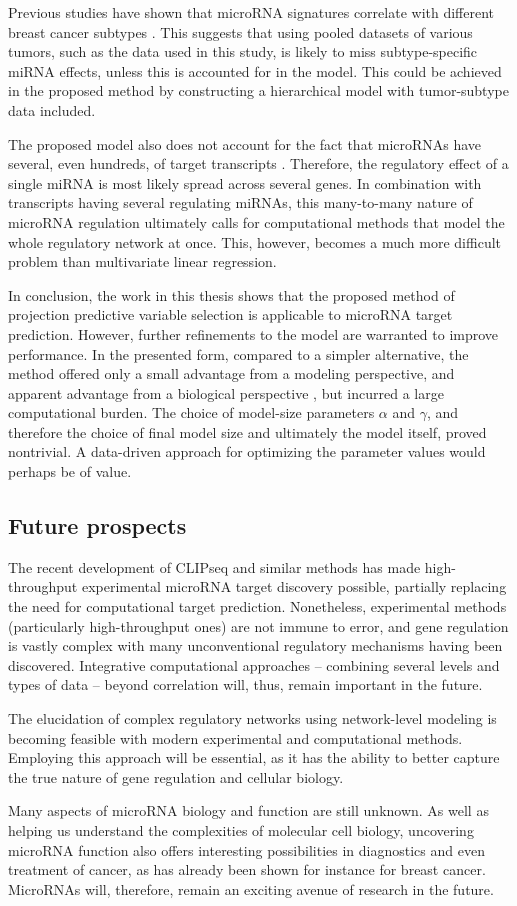 Previous studies have shown that microRNA signatures correlate
with different breast cancer subtypes \citep{Blenkiron2007}. This suggests that
using pooled datasets of various tumors, such as the data used in this
study, is likely to miss subtype-specific miRNA effects, unless this is accounted
for in the model. This could be achieved in the proposed method by
constructing a hierarchical model with tumor-subtype data included.

The proposed model also does not account for the fact that microRNAs have
several, even hundreds, of target transcripts \citep{}. Therefore, the regulatory
effect of a single miRNA is most likely spread across several genes. In
combination with transcripts having several regulating miRNAs, this many-to-many
nature of microRNA regulation ultimately calls for computational methods
that model the whole regulatory network at once. This, however, becomes a much
more difficult problem than multivariate linear regression.

In conclusion, the work in this thesis shows that the proposed method of
projection predictive variable selection is applicable to microRNA target
prediction. However, further refinements to the model are warranted to improve
performance. In the presented form, compared to a simpler alternative, the
method offered only a small advantage from a modeling perspective, and
apparent advantage from a biological perspective , but incurred a large
computational burden. The choice of model-size parameters $\alpha$ and
$\gamma$, and therefore the choice of final model size and ultimately the
model itself, proved nontrivial. A data-driven approach for optimizing the
parameter values would perhaps be of value.


\subsection*{Future prospects}

The recent development of CLIPseq and similar methods has made high-throughput
experimental microRNA target discovery possible, partially replacing the need
for computational target prediction. Nonetheless, experimental methods
(particularly high-throughput ones) are not immune to error, and gene
regulation is vastly complex with many unconventional regulatory mechanisms
having been discovered. Integrative computational approaches --
combining several levels and types of data -- beyond correlation will, thus, remain
important in the future.

The elucidation of complex regulatory networks using
network-level modeling is becoming feasible with modern experimental and
computational methods. Employing this approach will be essential, as it has the
ability to better capture the true nature of gene regulation and cellular
biology.

Many aspects of microRNA biology and function are still unknown. As well as
helping us understand the complexities of molecular cell biology, uncovering
microRNA function also offers interesting possibilities in diagnostics and even
treatment of cancer, as has already been shown for instance for breast
cancer. MicroRNAs will, therefore, remain an exciting avenue of research in the future.
